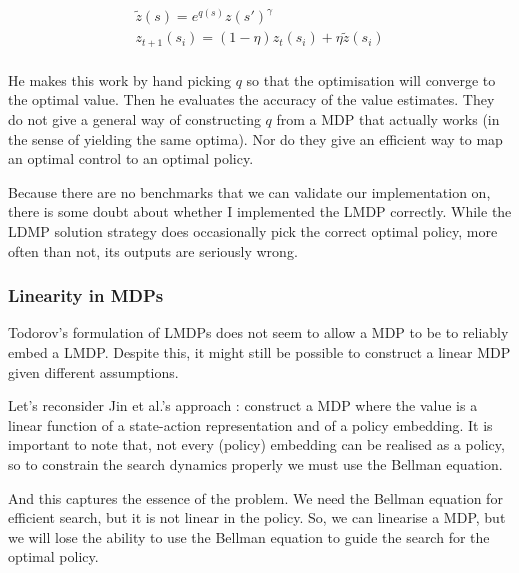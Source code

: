 \begin{align*}
\tilde z(s) = e^{q(s)}z(s{'})^{\gamma} \tag{linearised bellman eqn}\\
z_{t+1}(s_i) = (1- \eta)z_{t}(s_i) + \eta\tilde z(s_i) \tag{$Z$ iteration}\\
\end{align*}

He makes this work by hand picking $q$ so that the optimisation will converge to the optimal value.
Then he evaluates the accuracy of the value estimates.
They do not give a general way of constructing $q$ from a MDP that actually works (in the sense of yielding the same optima).
Nor do they give an efficient way to map an optimal control to an optimal policy.


Because there are no benchmarks that we can validate our implementation on,
there is some doubt about whether I implemented the LMDP correctly. While the
LDMP solution strategy does occasionally pick the correct optimal policy, more often than not,
its outputs are seriously wrong.

\subsubsection{Linearity in MDPs}

Todorov's formulation of LMDPs does not seem to allow a MDP to be to reliably embed a LMDP.
Despite this, it might still be possible to construct a linear MDP given different assumptions.

Let's reconsider Jin et al.'s approach \cite{Wang}: construct a MDP where the value is a
linear function of a state-action representation and of a policy embedding.
It is important to note that, not every (policy) embedding can be realised as a policy, so to constrain the search dynamics properly
we must use the Bellman equation.

And this captures the essence of the problem. We need the Bellman equation for efficient search, but it is not linear in the policy.
So, we can linearise a MDP, but we will lose the ability to use the Bellman equation to guide the search for the optimal policy.

